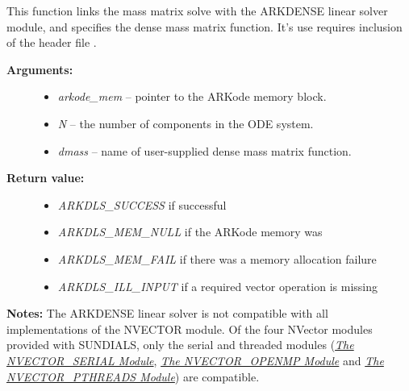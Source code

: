 \documentclass[letterpaper,10pt,english]{sphinxmanual}
\begin{document}
\begin{fulllineitems}
\label{c_interface/User_callable:ARKMassDense}
This function links the mass matrix solve with the ARKDENSE linear
solver module, and specifies the dense mass matrix function.  It's
use requires inclusion of the header file .
\begin{description}
\item[{\textbf{Arguments:}}] \leavevmode\begin{itemize}
\item {} 
\emph{arkode\_mem} -- pointer to the ARKode memory block.

\item {} 
\emph{N} -- the number of components in the ODE system.

\item {} 
\emph{dmass} -- name of user-supplied dense mass matrix function.

\end{itemize}

\item[{\textbf{Return value:}}] \leavevmode\begin{itemize}
\item {} 
\emph{ARKDLS\_SUCCESS}   if successful

\item {} 
\emph{ARKDLS\_MEM\_NULL}  if the ARKode memory was 

\item {} 
\emph{ARKDLS\_MEM\_FAIL}  if there was a memory allocation failure

\item {} 
\emph{ARKDLS\_ILL\_INPUT} if a required vector operation is missing

\end{itemize}

\end{description}

\textbf{Notes:}  The ARKDENSE linear solver is not compatible with all
implementations of the NVECTOR module. Of the four NVector
modules provided with SUNDIALS, only the serial and threaded
modules ({\hyperref[nvectors/NVector_Serial:nvectors-nvserial]{\emph{The NVECTOR\_SERIAL Module}}}, {\hyperref[nvectors/NVector_OpenMP:nvectors-openmp]{\emph{The NVECTOR\_OPENMP Module}}} and
{\hyperref[nvectors/NVector_Pthreads:nvectors-pthreads]{\emph{The NVECTOR\_PTHREADS Module}}}) are compatible.

\end{fulllineitems}
\end{document}

